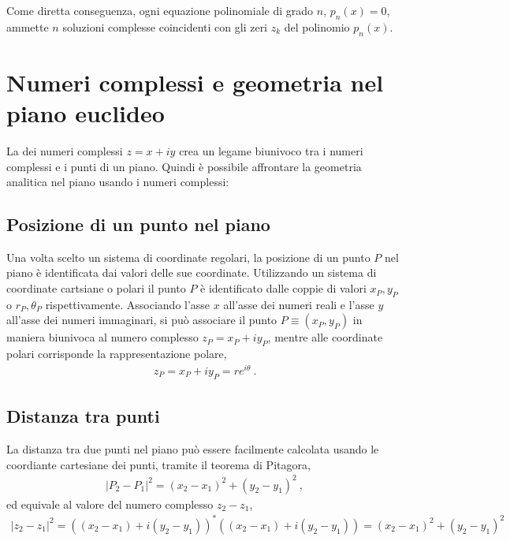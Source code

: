 \documentclass[letterpaper,10pt,italian]{jupyterBook}
\begin{document}
\sphinxAtStartPar
Come diretta conseguenza, ogni equazione polinomiale di grado \(n\), \(p_n(x) = 0\), ammette \(n\) soluzioni complesse coincidenti con gli zeri \(z_k\) del polinomio \(p_n(x)\).


\section{Numeri complessi e geometria nel piano euclideo}
\label{\detokenize{ch/algebra/complex-algebra:numeri-complessi-e-geometria-nel-piano-euclideo}}\label{\detokenize{ch/algebra/complex-algebra:math-hs-algebra-complex-geometry-2d}}
\sphinxAtStartPar
La {\hyperref[\detokenize{ch/algebra::doc}]{}} dei numeri complessi \(z = x + i y\) crea un legame biunivoco tra i numeri complessi e i punti di un piano. Quindi è possibile affrontare la geometria analitica nel piano usando i numeri complessi:


\subsection{Posizione di un punto nel piano}
\label{\detokenize{ch/algebra/complex-algebra:posizione-di-un-punto-nel-piano}}
\sphinxAtStartPar
Una volta scelto un sistema di coordinate regolari, la posizione di un punto \(P\) nel piano è identificata dai valori delle sue coordinate. Utilizzando un sistema di coordinate cartsiane o polari il punto \(P\) è identificato dalle coppie di valori \(x_P, y_P\) o \(r_P, \theta_P\) rispettivamente. Associando l’asse \(x\) all’asse dei numeri reali e l’asse \(y\) all’asse dei numeri immaginari, si può associare il punto \(P \equiv (x_P, y_P)\) in maniera biunivoca al numero complesso \(z_P = x_P + i y_P\), mentre alle coordinate polari corrisponde la rappresentazione polare,
\begin{equation*}
\begin{split}z_P = x_P + i y_P = r e^{i \theta} \ .\end{split}
\end{equation*}

\subsection{Distanza tra punti}
\label{\detokenize{ch/algebra/complex-algebra:distanza-tra-punti}}
\sphinxAtStartPar
La distanza tra due punti nel piano può essere facilmente calcolata usando le coordiante cartesiane dei punti, tramite il teorema di Pitagora,
\begin{equation*}
\begin{split}|P_2 - P_1|^2 = (x_2 - x_1)^2 + (y_2 - y_1)^2 \ ,\end{split}
\end{equation*}
\sphinxAtStartPar
ed equivale al valore del numero complesso \(z_2 - z_1\),
\begin{equation*}
\begin{split}|z_2 - z_1|^2 = ((x_2-x_1) + i(y_2-y_1))^*((x_2-x_1) + i(y_2-y_1)) = (x_2 - x_1)^2 + (y_2 - y_1)^2 \end{split}
\end{equation*}
\end{document}
